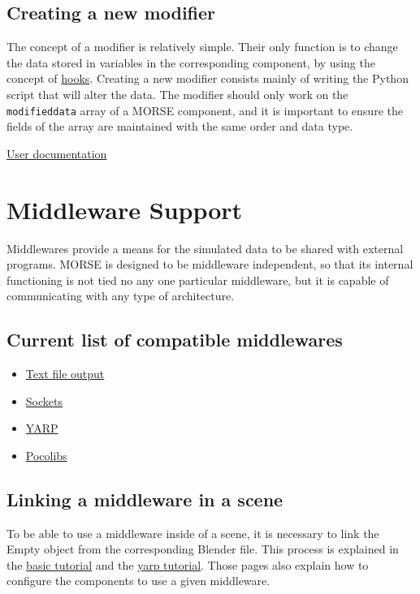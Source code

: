 \documentclass[twoside,a4paper,10pt]{report}
\newcommand{\dokutitlelevelone}[1]{\chapter{#1}}
\newcommand{\dokutitleleveltwo}[1]{\section{#1}}
\newcommand{\dokumonospace}[1]{\texttt{#1}}
\newcommand{\dokuitem}{\item}
\newcommand{\dokuquoting}{\textbar}
\begin{document}
\dokutitleleveltwo{Creating a new modifier}
\label{2f5deef38336990fa7f864f2028d68a9}%

The concept of a modifier is relatively simple. Their only function is to change the data stored in variables in the corresponding component, by using the concept of \hyperref[4e819c837d54a6ed09abc77a8560a66f]{hooks}. Creating a new modifier consists mainly of writing the Python script that will alter the data. The modifier should only work on the \dokumonospace{modified{\textunderscore}data} array of a MORSE component, and it is important to ensure the fields of the array are maintained with the same order and data type.

{\dokuquoting}{\dokuquoting} \hyperref[a80da1282f2c775bbc5f2c92c836968b]{ User documentation}


\dokutitlelevelone{Middleware Support}
\label{4303941a1597ae94654bd96854480742}%
\label{9a05db9c4b60b0527010fd997682f523}%

Middlewares provide a means for the simulated data to be shared with external programs. MORSE is designed to be middleware independent, so that its internal functioning is not tied no any one particular middleware, but it is capable of communicating with any type of architecture.


\dokutitleleveltwo{Current list of compatible middlewares}
\label{92515de7e8c9f43d6ca122cbbfd1809e}%

\begin{itemize}
\dokuitem  \hyperref[1cb251ec0d568de6a929b520c4aed8d1]{ Text file output}
\dokuitem  \hyperref[61f2529360aec54f5dc9804b842cf3fa]{ Sockets}
\dokuitem  \hyperref[ec46d0b85077d7a7fe8da2e2b4c70462]{ YARP}
\dokuitem  \hyperref[15f13a3fccdd1ef095539316b61c03c8]{ Pocolibs}
\end{itemize}

\dokutitleleveltwo{Linking a middleware in a scene}
\label{5ded332fc3ba470e4d4d290c9bf26a19}%

To be able to use a middleware inside of a scene, it is necessary to link the Empty object from the corresponding Blender file. This process is explained in the \hyperref[0575c8d592fb7b088226750aceec2b4e]{ basic tutorial} and the \hyperref[1dd029a60f7f3dd1deaf993ce4538edf]{ yarp tutorial}. Those pages also explain how to configure the components to use a given middleware.
\end{document}
